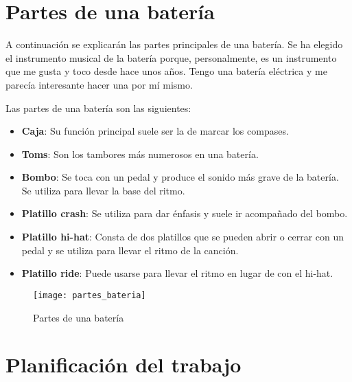 
    \section{Partes de una batería} %
    \label{sec:PartesDeUnaBateria}

        A continuación se explicarán las partes principales de una batería. Se ha elegido el instrumento musical de la
        batería porque, personalmente, es un instrumento que me gusta y toco desde hace unos años. Tengo una batería
        eléctrica y me parecía interesante hacer una por mí mismo.

        Las partes de una batería son las siguientes:

        \begin{itemize}
            \item \textbf{Caja}: Su función principal suele ser la de marcar los compases.
            \item \textbf{Toms}: Son los tambores más numerosos en una batería.
            \item \textbf{Bombo}: Se toca con un pedal y produce el sonido más grave de la batería. Se utiliza para
            llevar la base del ritmo.
            \item \textbf{Platillo crash}: Se utiliza para dar énfasis y suele ir acompañado del bombo.
            \item \textbf{Platillo hi-hat}: Consta de dos platillos que se pueden abrir o cerrar con un pedal y se
            utiliza para llevar el ritmo de la canción.
            \item \textbf{Platillo ride}: Puede usarse para llevar el ritmo en lugar de con el hi-hat.
        \end{itemize}

        \begin{figure}[ht]
            \centering
            \texttt{[image: partes\_bateria]}
            \caption{Partes de una batería \cite{partes_bateria_fuente}\label{fig:PartesBateria}}
        \end{figure}


    \section{Planificación del trabajo} %
    \label{sec:PlanificacionDelTrabajo}

